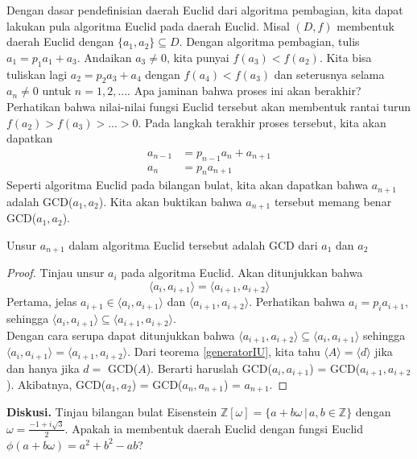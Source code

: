 	Dengan dasar pendefinisian daerah Euclid dari algoritma pembagian, kita dapat lakukan pula algoritma Euclid pada daerah Euclid. Misal $(D,f)$ membentuk daerah Euclid dengan $\{a_1, a_2\} \subseteq D$. Dengan algoritma pembagian, tulis $a_1 = p_1 a_1 + a_3$. Andaikan $a_3 \ne 0$, kita punyai $f(a_3) < f(a_2)$. Kita bisa tuliskan lagi $a_2 = p_2 a_3 + a_4$ dengan $f(a_4) < f(a_3)$ dan seterusnya selama $a_n \ne 0$ untuk $n = 1,2,...$. Apa jaminan bahwa proses ini akan berakhir? Perhatikan bahwa nilai-nilai fungsi Euclid tersebut akan membentuk rantai turun $f(a_2) > f(a_3) > ... > 0$. Pada langkah terakhir proses tersebut, kita akan dapatkan
	\begin{equation*}
	\begin{split}
	a_{n-1} & = p_{n-1}a_n + a_{n+1} \\
	a_n & = p_n a_{n+1}
	\end{split}
	\end{equation*}
	Seperti algoritma Euclid pada bilangan bulat, kita akan dapatkan bahwa $a_{n+1}$ adalah GCD($a_1, a_2$). Kita akan buktikan bahwa $a_{n+1}$ tersebut memang benar GCD($a_1, a_2$).
	\begin{theorem}
		Unsur $a_{n+1}$ dalam algoritma Euclid tersebut adalah GCD dari $a_1$ dan $a_2$
	\end{theorem}
	\begin{proof}
		Tinjau unsur $a_i$ pada algoritma Euclid. Akan ditunjukkan bahwa $$\langle a_i, a_{i+1} \rangle = \langle a_{i+1}, a_{i+2} \rangle$$
		Pertama, jelas $a_{i+1} \in \langle a_{i}, a_{i+1} \rangle$ dan $\langle a_{i+1}, a_{i+2} \rangle$. Perhatikan bahwa $a_i = p_i a_{i+1}$, sehingga $\langle a_{i}, a_{i+1} \rangle \subseteq \langle a_{i+1}, a_{i+2} \rangle$.\\
		Dengan cara serupa dapat ditunjukkan bahwa $\langle a_{i+1}, a_{i+2} \rangle \subseteq \langle a_{i}, a_{i+1} \rangle$ sehingga $\langle a_{i}, a_{i+1} \rangle = \langle a_{i+1}, a_{i+2} \rangle$. Dari teorema \ref{generatorIU}, kita tahu $\langle A \rangle = \langle d \rangle$ jika dan hanya jika $d =$ GCD($A$). Berarti haruslah GCD($a_i, a_{i+1}$) = GCD($a_{i+1}, a_{i+2}$). Akibatnya, GCD($a_1, a_2$) = GCD($a_n, a_{n+1}$) = $a_{n+1}$.
	\end{proof}
	\textbf{Diskusi.} Tinjau bilangan bulat Eisenstein $\mathbb{Z}[\omega] = \{a + b\omega \, | \, a,b \in \mathbb{Z} \}$ dengan $\omega = \frac{-1+i\sqrt{3}}{2}$. Apakah ia membentuk daerah Euclid dengan fungsi Euclid $\phi(a+b\omega) = a^2 + b^2 - ab$?
